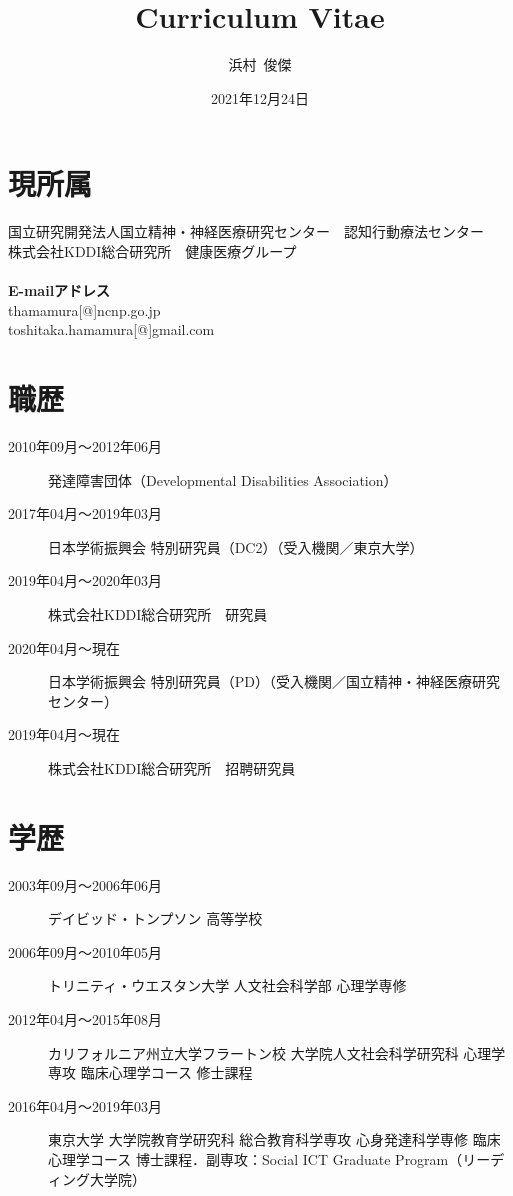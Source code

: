 \documentclass{article}
\begin{document}
\title{Curriculum Vitae}
\author{浜村\ 俊傑}
\date{2021年12月24日}
\maketitle

\noindent
\section{現所属}
国立研究開発法人国立精神・神経医療研究センター　認知行動療法センター\\
株式会社KDDI総合研究所　健康医療グループ\\~\\
\textbf{E-mailアドレス}\\
thamamura[@]ncnp.go.jp\\
toshitaka.hamamura[@]gmail.com

\section{職歴}
\begin{description}
	\item [2010年09月～2012年06月] 発達障害団体（Developmental Disabilities Association）
	\item [2017年04月～2019年03月] 日本学術振興会 特別研究員（DC2）（受入機関／東京大学）
	\item [2019年04月～2020年03月] 株式会社KDDI総合研究所　研究員
	\item [2020年04月～現在] 日本学術振興会 特別研究員（PD）（受入機関／国立精神・神経医療研究センター）
	\item [2019年04月～現在] 株式会社KDDI総合研究所　招聘研究員
\end{description}

\section{学歴}
\begin{description}
	\item [2003年09月～2006年06月] デイビッド・トンプソン 高等学校
	\item [2006年09月～2010年05月] トリニティ・ウエスタン大学 人文社会科学部 心理学専修
	\item [2012年04月～2015年08月] カリフォルニア州立大学フラートン校 大学院人文社会科学研究科 心理学専攻 臨床心理学コース 修士課程
	\item [2016年04月～2019年03月] 東京大学 大学院教育学研究科 総合教育科学専攻 心身発達科学専修 臨床心理学コース 博士課程．副専攻：Social ICT Graduate Program（リーディング大学院）
\end{description}
\end{document}
